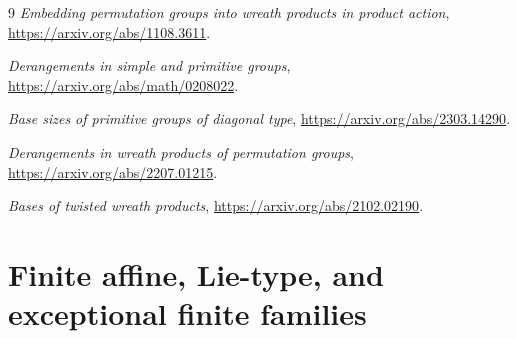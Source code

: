 \documentclass[10pt]{article}
\begin{document}
\begin{thebibliography}{9}
\emph{Embedding permutation groups into wreath products in product action},
\url{https://arxiv.org/abs/1108.3611}.

\emph{Derangements in simple and primitive groups},
\url{https://arxiv.org/abs/math/0208022}.

\emph{Base sizes of primitive groups of diagonal type},
\url{https://arxiv.org/abs/2303.14290}.

\emph{Derangements in wreath products of permutation groups},
\url{https://arxiv.org/abs/2207.01215}.

\emph{Bases of twisted wreath products},
\url{https://arxiv.org/abs/2102.02190}.
\end{thebibliography}

\clearpage
\part{Finite affine, Lie-type, and exceptional finite families}
\end{document}
